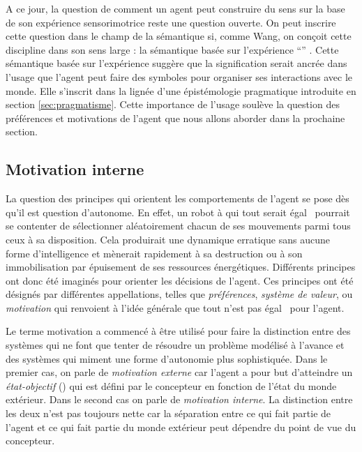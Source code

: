 A ce jour, la question de comment un agent peut construire du sens sur la base de son expérience sensorimotrice reste une question ouverte. 
On peut inscrire cette question dans le champ de la sémantique si, comme Wang, on conçoit cette discipline dans son sens large : la sémantique basée sur l'expérience  ``'' \cite[p.~286]{wang_experience-grounded_2005}.
Cette sémantique basée sur l'expérience suggère que la signification serait ancrée dans l'usage que l'agent peut faire des symboles pour organiser ses interactions avec le monde. 
Elle s'inscrit dans la lignée d'une épistémologie pragmatique introduite en section \ref{sec:pragmatisme}. 
Cette importance de l'usage soulève la question des préférences et motivations de l'agent que nous allons aborder dans la prochaine section.




\subsection{Motivation interne}
\label{sec:motivation}

\noindent
La question des principes qui orientent les comportements de l'agent se pose dès qu'il est question d'autonome.
En effet, un robot à qui \og tout serait égal \fg\ pourrait se contenter de sélectionner aléatoirement chacun de ses mouvements parmi tous ceux à sa disposition. 
Cela produirait une dynamique erratique sans aucune forme d'intelligence et mènerait rapidement à sa destruction ou à son immobilisation par épuisement de ses ressources énergétiques. 
Différents principes ont donc été imaginés pour orienter les décisions de l'agent.
Ces principes ont été désignés par différentes appellations, telles que \emph{préférences}, \emph{système de valeur}, ou \emph{motivation} qui renvoient à l'idée générale que \og tout n'est pas égal \fg\ pour l'agent.

Le terme motivation a commencé à être utilisé pour faire la distinction entre des systèmes qui ne font que tenter de résoudre un problème modélisé à l'avance et des systèmes qui miment une forme d'autonomie plus sophistiquée. 
Dans le premier cas, on parle de \emph{motivation externe} car l'agent a pour but d'atteindre un \emph{état-objectif} () qui est défini par le concepteur en fonction de l'état du monde extérieur. 
Dans le second cas on parle de \emph{motivation interne}. 
La distinction entre les deux n'est pas toujours nette car la séparation entre ce qui fait partie de l'agent et ce qui fait partie du monde extérieur peut dépendre du point de vue du concepteur. 

